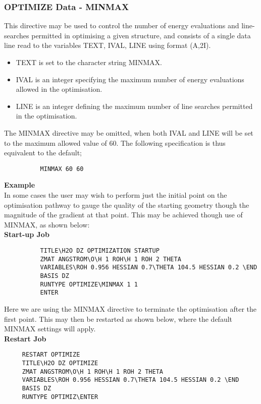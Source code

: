 \documentclass[11pt,fleqn]{article}
\begin{document}
\subsubsection[OPTIMIZE Data - MINMAX]{OPTIMIZE Data - MINMAX}

This directive may be used to
control the number of energy evaluations and line-searches permitted
in optimising a given structure, and consists of a single 
data line read to the variables TEXT, IVAL, LINE using format (A,2I).
\begin{itemize}
\item TEXT is set to the character string MINMAX.
\item IVAL is an integer specifying  the maximum number of 
energy evaluations allowed in the optimisation.
\item LINE is an integer defining the maximum number of line searches
permitted in the optimisation.
\end{itemize}
The MINMAX directive may be omitted, when both IVAL and LINE will
be set to the maximum allowed value of 60. 
The following specification is thus 
equivalent to the default;

{
\footnotesize
\begin{verbatim}
          MINMAX 60 60
\end{verbatim}
}
{\bf Example}\\

In some cases the user may wish to perform just the
initial point on the optimisation pathway to gauge the quality
of the starting geometry though the magnitude of the gradient at
that point. This may be achieved though use of MINMAX, as shown
below:\\

{\bf Start-up Job}
{
\footnotesize
\begin{verbatim}
          TITLE\H2O DZ OPTIMIZATION STARTUP
          ZMAT ANGSTROM\O\H 1 ROH\H 1 ROH 2 THETA
          VARIABLES\ROH 0.956 HESSIAN 0.7\THETA 104.5 HESSIAN 0.2 \END
          BASIS DZ
          RUNTYPE OPTIMIZE\MINMAX 1 1
          ENTER
\end{verbatim}
}
Here we are using the MINMAX directive to terminate the
optimisation after the first point. This may then be restarted
as shown below, where the default MINMAX settings will apply.\\

{\bf Restart Job}
{
\footnotesize
\begin{verbatim}
     RESTART OPTIMIZE
     TITLE\H2O DZ OPTIMIZE
     ZMAT ANGSTROM\O\H 1 ROH\H 1 ROH 2 THETA
     VARIABLES\ROH 0.956 HESSIAN 0.7\THETA 104.5 HESSIAN 0.2 \END
     BASIS DZ
     RUNTYPE OPTIMIZ\ENTER
\end{verbatim}
}
\end{document}
